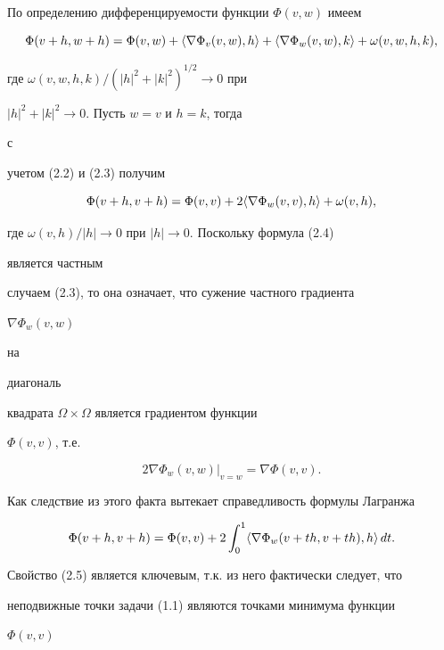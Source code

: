По определению дифференцируемости функции $\Phi(v,w)$ имеем


\begin{equation}


\Phi(v+h,w+h)=\Phi(v,w)+\la\nabla\Phi_v(v,w),h\ra+


\la\nabla\Phi_w(v,w),k\ra+\omega(v,w,h,k),


\end{equation}


где $\omega(v,w,h,k)/(|h|^2+|k|^2)^{1/2}\to 0$ при


$|h|^2+|k|^2\to 0$. Пусть $w=v$ и $h=k$, тогда


с


учетом (2.2) и (2.3) получим


\begin{equation}


\Phi(v+h,v+h)=\Phi(v,v)+2\la\nabla\Phi_w(v,v),h\ra+


\omega(v,h),


\end{equation}


где $\omega(v,h)/|h|\to 0$ при $|h|\to 0$. Поскольку формула (2.4)


является частным


случаем (2.3), то она означает, что сужение частного градиента


$\nabla\Phi_w(v,w)$


на


диагональ


квадрата $\Omega\times\Omega$ является градиентом функции


$\Phi(v,v)$, т.е.


\begin{equation}


2\nabla\Phi_w(v,w)|_{v=w}=\nabla\Phi(v,v).


\end{equation}


Как следствие из этого факта вытекает справедливость формулы Лагранжа


$$


\Phi(v+h,v+h)=\Phi(v,v)+2\int^1_0\la\nabla\Phi_w


(v+th,v+th),h\ra\,dt.


$$


Свойство (2.5) является ключевым, т.к. из него фактически следует, что


неподвижные точки задачи (1.1) являются точками минимума функции


$\Phi(v,v)$


